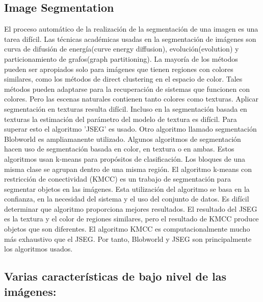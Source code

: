 \documentclass{llncs}
\begin{document}
\subsection{ Image Segmentation}
El proceso autom\'atico de la realizaci\'on de la segmentaci\'on de una imagen es una tarea dif\'icil. Las t\'ecnicas acad\'emicas 
usadas en la segmentaci\'on de im\'agenes son curva de difusi\'on de energ\'ia(curve energy diffusion), evoluci\'on(evolution) y particionamiento 
de grafos(graph partitioning). La mayor\'ia de los m\'etodos pueden ser apropiados solo para im\'agenes que tienen regiones con colores
similares, como los m\'etodos de direct clustering en el espacio de color. Tales m\'etodos pueden adaptarse para la recuperaci\'on de sistemas 
que funcionen con colores. Pero las escenas naturales contienen tanto colores como texturas. Aplicar segmentaci\'on en texturas resulta 
dif\'icil. Incluso en la segmentaci\'on basada en texturas la estimaci\'on del par\'ametro del modelo de textura es dif\'icil. Para 
superar esto el algoritmo 'JSEG' es usado. Otro algoritmo llamado segmentaci\'on Blobworld es ampliamanente utilizado. Algunos algoritmos 
de segmentaci\'on hacen uso de segmentaci\'on basada en color, en textura o en ambas. Estos algoritmos usan k-means para prop\'ositos de 
clasificaci\'on. Los bloques de una misma clase se agrupan dentro de una misma regi\'on. El algoritmo k-means con restricci\'on de 
conectividad (KMCC) es un trabajo de segmentaci\'on para segmentar objetos en las im\'agenes. Esta utilizaci\'on del algoritmo  se basa 
en la confianza, en la necesidad del sistema y el uso del conjunto de datos. Es dif\'icil determinar que algoritmo proporciona mejores 
resultados. El resultado del JSEG es la textura y el color de regiones similares, pero el resultado de KMCC produce objetos que son diferentes.
El algoritmo KMCC es computacionalmente mucho m\'as exhaustivo que el JSEG. Por tanto, Blobworld y JSEG son principalmente los algoritmos usados.

\subsection { Varias caracter\'isticas de bajo nivel de las im\'agenes:}
\end{document}
